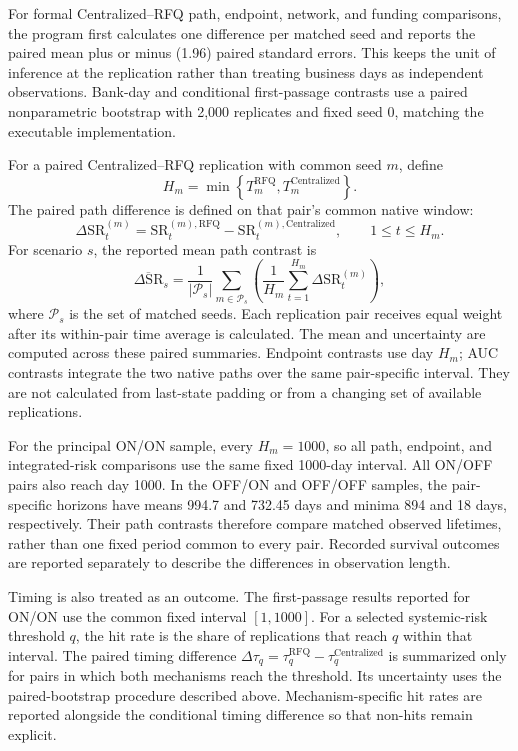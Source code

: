 For formal Centralized--RFQ path, endpoint, network, and funding
comparisons, the program first calculates one difference per matched seed
and reports the paired mean plus or minus (1.96) paired standard errors.
This keeps the unit of inference at the replication rather than treating
business days as independent observations. Bank-day and conditional
first-passage contrasts use a paired nonparametric bootstrap with 2,000
replicates and fixed seed 0, matching the executable implementation.

For a paired Centralized--RFQ replication with common seed \(m\), define
\begin{equation}
H_m=\min\left\{T_m^{\mathrm{RFQ}},T_m^{\mathrm{Centralized}}\right\}.
\label{eq:pair-native-horizon}
\end{equation}
The paired path difference is defined on that pair's common native window:
\begin{equation}
\Delta\mathrm{SR}_t^{(m)}
=\mathrm{SR}_t^{(m),\mathrm{RFQ}}
-\mathrm{SR}_t^{(m),\mathrm{Centralized}},\qquad 1\leq t\leq H_m.
\label{eq:paired-sr-difference}
\end{equation}
For scenario \(s\), the reported mean path contrast is
\begin{equation}
\overline{\Delta\mathrm{SR}}_s
=\frac{1}{\lvert\mathcal P_s\rvert}
\sum_{m\in\mathcal P_s}
\left(\frac{1}{H_m}\sum_{t=1}^{H_m}\Delta\mathrm{SR}_t^{(m)}\right),
\label{eq:paired-mean-path}
\end{equation}
where \(\mathcal P_s\) is the set of matched seeds. Each replication pair
receives equal weight after its within-pair time average is calculated.
The mean and uncertainty are computed across these paired summaries.
Endpoint contrasts use day \(H_m\); AUC contrasts integrate the two native
paths over the same pair-specific interval. They are not calculated from
last-state padding or from a changing set of available replications.

For the principal ON/ON sample, every \(H_m=1000\), so all path, endpoint,
and integrated-risk comparisons use the same fixed 1000-day interval.
All ON/OFF pairs also reach day 1000. In the OFF/ON and OFF/OFF samples,
the pair-specific horizons have means 994.7 and 732.45 days and minima
894 and 18 days, respectively. Their path contrasts therefore compare
matched observed lifetimes, rather than one fixed period common to every
pair. Recorded survival outcomes are reported separately to describe the
differences in observation length.

Timing is also treated as an outcome. The first-passage results reported
for ON/ON use the common fixed interval \([1,1000]\). For a selected
systemic-risk threshold \(q\), the hit rate is the share of replications
that reach \(q\) within that interval. The paired timing difference
\(\Delta\tau_q=\tau_q^{\mathrm{RFQ}}-\tau_q^{\mathrm{Centralized}}\)
is summarized only for pairs in which both mechanisms reach the threshold.
Its uncertainty uses the paired-bootstrap procedure described above.
Mechanism-specific hit rates are reported alongside the conditional timing
difference so that non-hits remain explicit.

